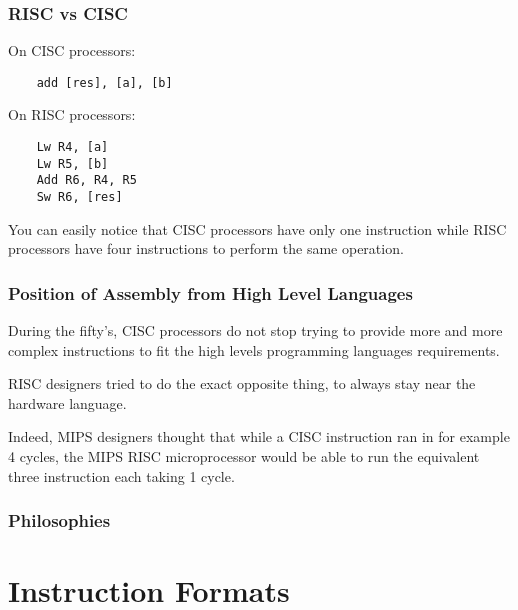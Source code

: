 
\begin{frame}[containsverbatim]
  \frametitle{RISC vs CISC}

  On CISC processors:

  \begin{verbatim}
    add [res], [a], [b]
  \end{verbatim}

  On RISC processors:

  \begin{verbatim}
    Lw R4, [a]
    Lw R5, [b]
    Add R6, R4, R5
    Sw R6, [res]
  \end{verbatim}

  You can easily notice that CISC processors have only one instruction while
  RISC processors have four instructions to perform the same operation.
\end{frame}


\begin{frame}
  \frametitle{Position of Assembly from High Level Languages}

  During the fifty's, CISC processors do not stop trying to provide
  more and more complex instructions to fit the high levels programming
  languages requirements.

  \-

  RISC designers tried to do the exact opposite thing, to always stay
  near the hardware language.

  \-

  Indeed, MIPS designers thought that while a CISC instruction ran in
  for example 4 cycles, the MIPS RISC microprocessor would be able to
  run the equivalent three instruction each taking 1 cycle.
\end{frame}


\begin{frame}
  \frametitle{Philosophies}

  \begin{center}
  \end{center}
\end{frame}

%
%

\section{Instruction Formats}

